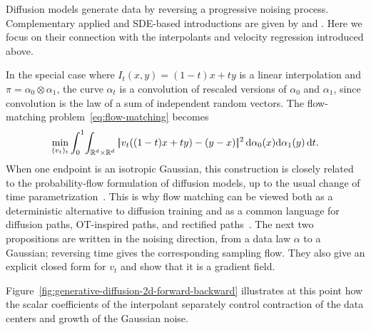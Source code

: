 Diffusion models generate data by reversing a progressive noising process. Complementary applied and SDE-based introductions are given by \citet{HighamHighamGrindrod2025DiffusionIntroduction} and \citet{TangZhao2025DiffusionTutorial}. Here we focus on their connection with the interpolants and velocity regression introduced above.

In the special case where $I_t(x,y)=(1-t)x+ty$ is a linear interpolation and $\pi = \alpha_0 \otimes \alpha_1$, the curve $\alpha_t$ is a convolution of rescaled versions of $\alpha_0$ and $\alpha_1$, since convolution is the law of a sum of independent random vectors. The flow-matching problem~\eqref{eq:flow-matching} becomes
\[
    \min_{(v_t)_t} \int_0^1\!\int_{\mathbb{R}^{d} \times \mathbb{R}^d} |\!| v_t( (1-t)x+t y ) - (y-x)  |\!|^2 \, \mathrm{d}\alpha_0(x) \mathrm{d}\alpha_1(y)\,\mathrm{d} t.
\]
When one endpoint is an isotropic Gaussian, this construction is closely related to the probability-flow formulation of diffusion models, up to the usual change of time parametrization~\citep{Song2021ScoreSDE}. This is why flow matching can be viewed both as a deterministic alternative to diffusion training and as a common language for diffusion paths, OT-inspired paths, and rectified paths~\citep{Lipman2022FlowMatching,Liu2023RectifiedFlow,Albergo2025StochasticInterpolants}. The next two propositions are written in the noising direction, from a data law $\alpha$ to a Gaussian; reversing time gives the corresponding sampling flow. They also give an explicit closed form for $v_t$ and show that it is a gradient field.

Figure~\ref{fig:generative-diffusion-2d-forward-backward} illustrates at this point how the scalar coefficients of the interpolant separately control contraction of the data centers and growth of the Gaussian noise.

